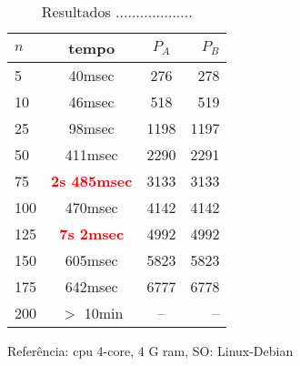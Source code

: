 \begin{table}
  \caption{Resultados ...................}
   \label{tab:}
  
  \begin{center}
  \begin{tabular}{ l | c |c | r }
    \hline  \hline 
    $n$ & tempo & $P_A$ & $P_B$\\ \hline     \hline 
     5 & 40msec & 276 & 278 \\ \hline
    10 & 46msec & 518 & 519 \\ \hline
    25 & 98msec & 1198 & 1197 \\ \hline
    50 & 411msec & 2290 & 2291 \\ \hline
    75 & \textbf{\textcolor{red}{2s 485msec}} & 3133 & 3133 \\ \hline
    100 & 470msec & 4142 & 4142 \\ \hline 
    125 & \textbf{\textcolor{red}{7s 2msec}} & 4992 & 4992 \\ \hline 
    150 & 605msec & 5823 & 5823 \\ \hline 
    175 & 642msec &   6777 &  6778 \\ \hline 
    200 & $>$ 10min & -- & -- \\ \hline \hline
  \end{tabular}
  
\end{center}

\end{table}
Referência: cpu 4-core, 4 G ram, SO: Linux-Debian

